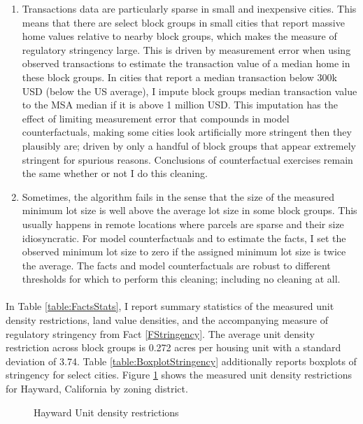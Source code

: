 \documentclass[12pt]{article}
\begin{document}
	\begin{enumerate}
		\item Transactions data are particularly sparse in small and inexpensive cities. This means that there are select block groups in small cities that report massive home values relative to nearby block groups, which makes the measure of regulatory stringency large. This is driven by measurement error when using observed transactions to estimate the transaction value of a median home in these block groups. In cities that report a median transaction below 300k USD (below the US average), I impute block groups median transaction value to the MSA median if it is above 1 million USD. This imputation has the effect of limiting measurement error that compounds in model counterfactuals, making some cities look artificially more stringent then they plausibly are; driven by only a handful of block groups that appear extremely stringent for spurious reasons. Conclusions of counterfactual exercises remain the same whether or not I do this cleaning.
		
		\item Sometimes, the algorithm fails in the sense that the size of the measured minimum lot size is well above the average lot size in some block groups. This usually happens in remote locations where parcels are sparse and their size idiosyncratic. For model counterfactuals and to estimate the facts, I set the observed minimum lot size to zero if the assigned minimum lot size is twice the average. The facts and model counterfactuals are robust to different thresholds for which to perform this cleaning; including no cleaning at all. 
	\end{enumerate}
	
	
	\paragraph*{}
	In Table \ref{table:FactsStats}, I report summary statistics of the measured unit density restrictions, land value densities, and the accompanying measure of regulatory stringency from Fact \ref{FStringency}.  The average unit density restriction across block groups is 0.272 acres per housing unit with a standard deviation of 3.74. Table \ref{table:BoxplotStringency} additionally reports boxplots of stringency for select cities. Figure \ref{figure:MinLotSizeExample} shows the measured unit density restrictions for Hayward, California by zoning district. 
	
	\begin{figure}[htbp!]
		\caption{Hayward Unit density restrictions}\label{figure:MinLotSizeExample}
		
	\end{figure}
	
\end{document}
